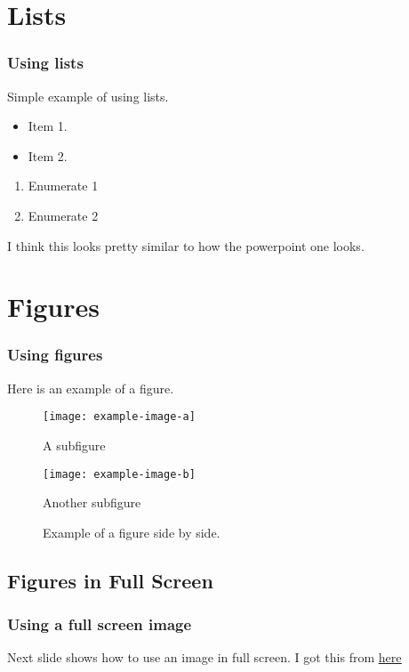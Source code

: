 \documentclass[
	11pt, %
	aspectratio=169, %
]{beamer}
\begin{document}
\section{Lists}
\begin{frame}
	\frametitle{Using lists}
  Simple example of using lists.
  \begin{itemize}
    \item Item 1.
    \item Item 2.
  \end{itemize}

  \begin{enumerate}
  \setlength{\leftmargini}{12pt}
    \item Enumerate 1
    \item Enumerate 2
  \end{enumerate}
  I think this looks pretty similar to how the powerpoint one looks.
\end{frame}

\section{Figures}
\begin{frame}
	\frametitle{Using figures}
  Here is an example of a figure.
  \begin{figure}
    \centering
      \begin{minipage}{.5\textwidth}
          \centering
          \texttt{[image: example-image-a]}
          \caption{A subfigure}
      \end{minipage}%
      \begin{minipage}{.5\textwidth}
          \centering
          \texttt{[image: example-image-b]}
          \caption{Another subfigure}
      \end{minipage}
    \caption{Example of a figure side by side.}
  \end{figure}
\end{frame}

\subsection{Figures in Full Screen}
\begin{frame}
	\frametitle{Using a full screen image}
  Next slide shows how to use an image in full screen. 
  I got this from 
  \href{
  https://tex.stackexchange.com/questions/3915/image-on-full-slide-in-beamer-package
  }{\color{RPIred}\underline{here}}
\end{frame}
\end{document}
